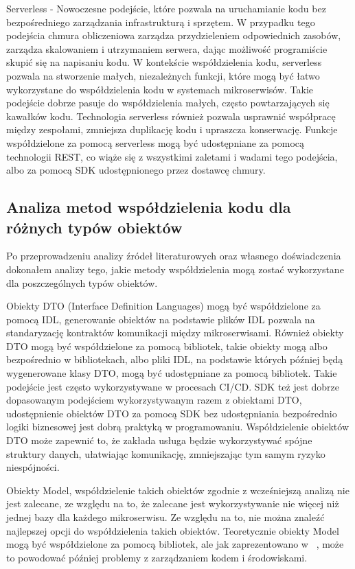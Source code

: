 \documentclass[runningheads,12pt]{llncs}
\begin{document}
Serverless - Nowoczesne podejście, które pozwala na uruchamianie kodu bez bezpośredniego zarządzania infrastrukturą i sprzętem. W przypadku tego podejścia chmura obliczeniowa zarządza przydzieleniem odpowiednich zasobów, zarządza skalowaniem i utrzymaniem serwera, dając możliwość programiście skupić się na napisaniu kodu. W kontekście współdzielenia kodu, serverless pozwala na stworzenie małych, niezależnych funkcji, które mogą być łatwo wykorzystane do współdzielenia kodu w systemach mikroserwisów. Takie podejście dobrze pasuje do współdzielenia małych, często powtarzających się kawałków kodu. Technologia serverless również pozwala usprawnić współpracę między zespołami, zmniejsza duplikację kodu i upraszcza konserwację. Funkcje współdzielone za pomocą serverless mogą być udostępniane za pomocą technologii REST, co wiąże się z wszystkimi zaletami i wadami tego podejścia, albo za pomocą SDK udostępnionego przez dostawcę chmury.

\subsection{Analiza metod współdzielenia kodu dla różnych typów obiektów}

Po przeprowadzeniu analizy źródeł literaturowych oraz własnego doświadczenia dokonałem analizy tego, jakie metody współdzielenia mogą zostać wykorzystane dla poszczególnych typów obiektów.

Obiekty DTO (Interface Definition Languages) mogą być współdzielone za pomocą IDL, generowanie obiektów na podstawie plików IDL pozwala na standaryzację kontraktów komunikacji między mikroserwisami. Również obiekty DTO mogą być współdzielone za pomocą bibliotek, takie obiekty mogą albo bezpośrednio w bibliotekach, albo pliki IDL, na podstawie których później będą wygenerowane klasy DTO, mogą być udostępniane za pomocą bibliotek. Takie podejście jest często wykorzystywane w procesach CI/CD. SDK też jest dobrze dopasowanym podejściem wykorzystywanym razem z obiektami DTO, udostępnienie obiektów DTO za pomocą SDK bez udostępniania bezpośrednio logiki biznesowej jest dobrą praktyką w programowaniu. Współdzielenie obiektów DTO może zapewnić to, że zakłada usługa będzie wykorzystywać spójne struktury danych, ułatwiając komunikację, zmniejszając tym samym ryzyko niespójności.

Obiekty Model, współdzielenie takich obiektów zgodnie z wcześniejszą analizą nie jest zalecane, ze względu na to, że zalecane jest wykorzystywanie nie więcej niż jednej bazy dla każdego mikroserwisu. Ze względu na to, nie można znaleźć najlepszej opcji do współdzielenia takich obiektów. Teoretycznie obiekty Model mogą być współdzielone za pomocą bibliotek, ale jak zaprezentowano w ~\cite{bhuyan2020microservices}, może to powodować później problemy z zarządzaniem kodem i środowiskami.
\end{document}
